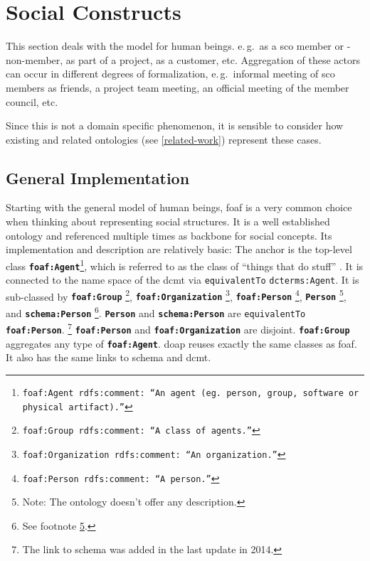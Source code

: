 \documentclass[a4paper, DIV=13, BCOR=0cm]{scrbook}
\newcommand{\eg}{e.\,g.\ }
\newcommand{\class}[1]{\texttt{\textbf{#1}}}
\newcommand{\relation}[1]{\texttt{#1}}
\newcommand{\foottt}[1]{\footnote{\texttt{#1}}}
\begin{document}
\section{Social Constructs }
 This section deals with the model for human beings.
 \eg as a \gls{sco} member or -non-member, as part of a project, as a customer, etc.
 Aggregation of these actors can occur in different degrees of formalization, \eg informal meeting of \gls{sco} members as friends, a project team meeting, an official meeting of the member council, etc. 

Since this is not a domain specific phenomenon, it is sensible to consider how existing and related ontologies (see \autoref{related-work}) represent these cases.

\subsection{General Implementation}
\label{human-beings-in-other-ontologies}
Starting with the general model of human beings, \gls{foaf} is a very common choice when thinking about representing social structures. It is a well established ontology and referenced multiple times as backbone for social concepts. Its implementation and description are relatively basic: The anchor is the top-level class \class{foaf:Agent}\foottt{foaf:Agent rdfs:comment: \enquote{An agent (eg. person, group, software or physical artifact).}}, which is referred to as the class of \enquote{things that do stuff} \cite[http://xmlns.com/foaf/spec/\#term\_Agent]{Dan-Brickley2014FOAF-Vocabulary}. It is connected to the name space of the \gls{dcmt} via \relation{equivalentTo} \relation{dcterms:Agent}. It is sub-classed by
%
\class{foaf:Group}%
	\foottt{foaf:Group rdfs:comment: \enquote{A class of agents.}},
%
\class{foaf:Organization}%
	\foottt{foaf:Organization rdfs:comment: \enquote{An organization.}},
%
\class{foaf:Person}%
	\foottt{foaf:Person rdfs:comment: \enquote{A person.}},
%
\class{Person}%
	\footnote{\label{footn:no-desc}Note: The ontology doesn't offer any description.}, and
\class{schema:Person}%
	\footnote{See footnote \ref{footn:no-desc}.}.
\class{Person} and \class{schema:Person} are \relation{equivalentTo} \class{foaf:Person}.%
	\footnote{The link to \gls{schema} was added in the last update in 2014.} \class{foaf:Person} and \class{foaf:Organization} are disjoint. \class{foaf:Group} aggregates any type of \class{foaf:Agent}. \gls{doap} reuses exactly the same classes as \gls{foaf}. It also has the same links to \gls{schema} and \gls{dcmt}.
\end{document}
